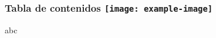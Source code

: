 \documentclass{beamer}
\begin{document}
\begin{frame}
  \frametitle{Tabla de contenidos \texttt{[image: example-image]}}
    abc
\end{frame} 
\end{document}
